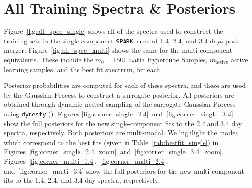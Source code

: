 \documentclass[twocolumn,twocolappendix]{aastex63}
\def\SPARK{\texttt{SPARK}}
\newcommand\redbf[1]{\textbf{\textcolor{red}{#1}}}
\begin{document}
\appendix{}

\section{All Training Spectra \& Posteriors}\label{app:allspec_posteriors}

Figure~\ref{fig:all_spec_single} shows all of the spectra used to construct the training sets in the single-component \SPARK~runs at 1.4, 2.4, and 3.4 days post-merger. Figure~\ref{fig:all_spec_multi} shows the same for the multi-component equivalents. These include the $m_0 = 1500$ Latin Hypercube Samples, $m_{\mathrm{active}}$ active learning samples, and the best fit spectrum, for each.

Posterior probabilities are computed for each of these spectra, and these are used by the Gaussian Process to construct a surrogate posterior. All posteriors are obtained through dynamic nested sampling of the surrogate Gaussian Process using \texttt{dynesty} (\citealt{speagle20}). Figures \ref{fig:corner_single_2.4}~and~\ref{fig:corner_single_3.4} show the full posteriors for the new single-component fits to the 2.4 and 3.4 day spectra, respectively. Both posteriors are multi-modal. We highlight the modes which correspond to the best fits (given in Table~\ref{tab:bestfit_single}) in Figures~\ref{fig:corner_single_2.4_zoom}~and~\ref{fig:corner_single_3.4_zoom}. Figures~\ref{fig:corner_multi_1.4},~\ref{fig:corner_multi_2.4}, and~\ref{fig:corner_multi_3.4} show the full posteriors for the new multi-component fits to the 1.4, 2.4, and 3.4 day spectra, respectively. %
\end{document}
